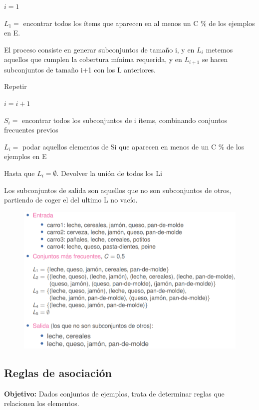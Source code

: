 \documentclass[12pt]{report} %
\begin{document}
$i = 1$

$L_1 =$ encontrar todos los ítems que aparecen en al menos un C \% de los ejemplos en E.

El proceso consiste en generar subconjuntos de tamaño i, y en $L_i$ metemos aquellos que cumplen la cobertura mínima requerida, y en $L_{i+1}$ se hacen subconjuntos de tamaño i+1 con los L anteriores.

\pagebreak

Repetir

\hspace{6mm} $i = i + 1$

\hspace{6mm} $S_i =$ encontrar todos los subconjuntos de i ítems, combinando conjuntos frecuentes previos

\hspace{6mm} $L_i =$ podar aquellos elementos de Si que aparecen en menos de un C \% de los ejemplos en E

Hasta que $L_i = \emptyset$. Devolver la unión de todos los Li

Los subconjuntos de salida son aquellos que no son subconjuntos de otros, partiendo de coger el del ultimo L no vacío.

\begin{figure}[H]
  {\includegraphics[scale=.4]{2021-04-10 01_06_33-ensembles-reglasAsociacion.pdf - Foxit Reader.png}}
\end{figure}

\subsection{Reglas de asociación}
\textbf{Objetivo:} Dados conjuntos de ejemplos, trata de determinar reglas que relacionen los elementos.
\end{document}
